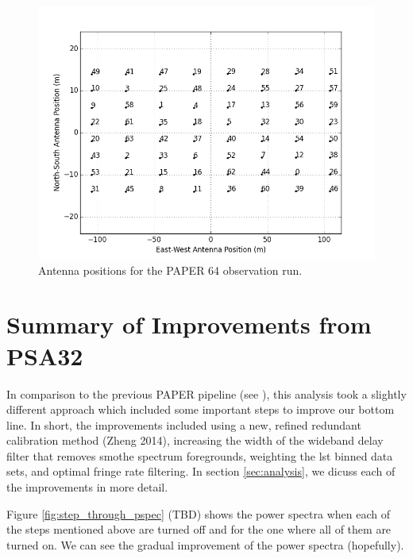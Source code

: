 \documentclass[twocolumn,numberedappendix]{emulateapj}
\begin{document}
\begin{figure}[!t]\centering
\includegraphics[width=1.85\columnwidth,height=\columnwidth]{plots/antenna_positions.png}
\caption{Antenna positions for the PAPER 64 observation run.}
\label{fig:antenna_positions}
\end{figure}

\section{Summary of Improvements from PSA32}
In comparison to the previous PAPER pipeline (see \cite{parsons_et_al2014}),
this analysis took a slightly different approach which included some important
steps to improve our bottom line. In short, the improvements included using a
new, refined redundant calibration method (Zheng 2014), increasing the width of
the wideband delay filter that removes smothe spectrum foregrounds, weighting
the lst binned data sets, and optimal fringe rate filtering. In section
\ref{sec:analysis}, we dicuss each of the improvements in more detail.

Figure \ref{fig:step_through_pspec} (TBD) shows the power spectra when each of
the steps mentioned above are turned off and for the one where all of them are
turned on. We can see the gradual improvement of the power spectra (hopefully).
\end{document}
